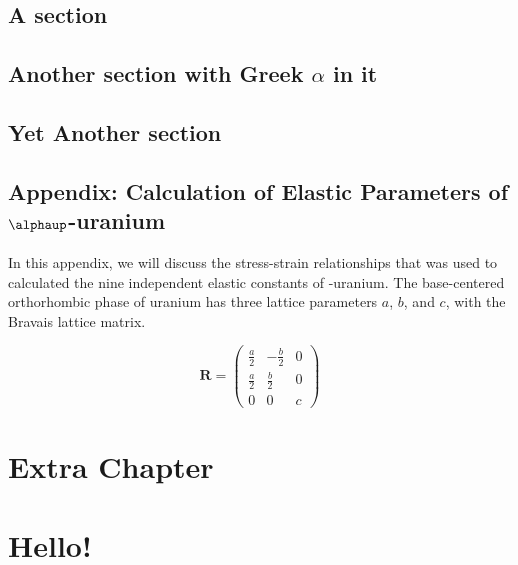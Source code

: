 \documentclass{MUthesis}
\newcommand*{\textalpha}{\text{\ensuremath{\alphaup}}}
\begin{document}
\section{A section}
\section[Another section with Greek $\alpha$ in it]
        {Another section with Greek \boldmath$\alpha$ in it}
\section{Yet Another section}
\clearpage
{}
\section*{\boldmath Appendix: Calculation of Elastic Parameters of $\alphaup$-uranium}\label{appen_elalpha}
In this appendix, we will discuss the stress-strain relationships that was used to calculated the nine independent elastic constants of \textalpha-uranium. The base-centered orthorhombic phase of uranium has three lattice parameters $a$, $b$, and $c$, with the Bravais lattice matrix.

\begin{equation}\label{eq_lattic_alphaU}
\mathbf{R} = \begin{pmatrix}
			\frac{a}{2} & -\frac{b}{2} & 0 \\
			\frac{a}{2} & \frac{b}{2} & 0 \\
			0			&    0        & c 
			\end{pmatrix}
\end{equation}


\chapter{Extra Chapter}

\appendix

\chapter{Hello!}
\end{document}
